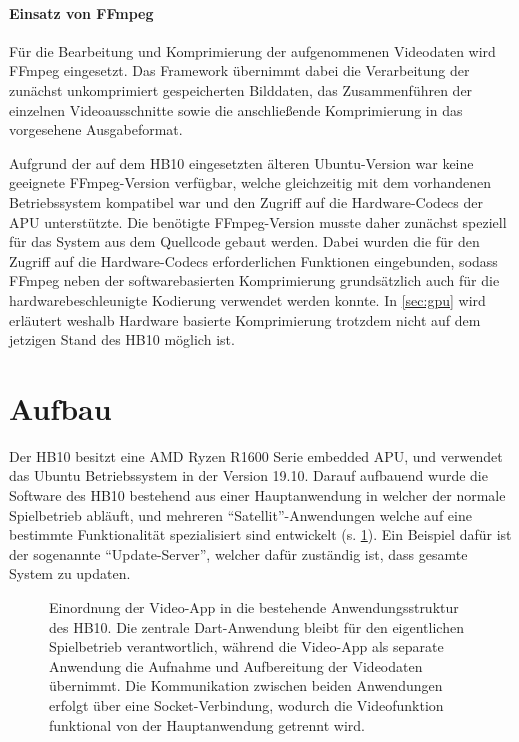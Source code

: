 \paragraph{Einsatz von FFmpeg} \label{sec:ffmpeg}

Für die Bearbeitung und Komprimierung der aufgenommenen Videodaten wird FFmpeg\cite{ffmpeg_doxygen} eingesetzt. Das Framework übernimmt dabei die Verarbeitung der zunächst unkomprimiert gespeicherten Bilddaten, das Zusammenführen der einzelnen Videoausschnitte sowie die anschließende Komprimierung in das vorgesehene Ausgabeformat. 

Aufgrund der auf dem HB10 eingesetzten älteren Ubuntu-Version war keine geeignete FFmpeg-Version verfügbar, welche gleichzeitig mit dem vorhandenen Betriebssystem kompatibel war und den Zugriff auf die Hardware-Codecs der APU unterstützte. 
Die benötigte FFmpeg-Version musste daher zunächst speziell für das System aus dem Quellcode gebaut werden. Dabei wurden die für den Zugriff auf die Hardware-Codecs erforderlichen Funktionen eingebunden, 
sodass FFmpeg neben der softwarebasierten Komprimierung grundsätzlich auch für die hardwarebeschleunigte Kodierung verwendet werden konnte. In \cref{sec:gpu} wird erläutert weshalb Hardware basierte Komprimierung trotzdem nicht auf dem jetzigen Stand des HB10 möglich ist.

\section{Aufbau}

Der HB10 besitzt eine AMD Ryzen R1600 Serie embedded APU, und verwendet das Ubuntu Betriebssystem in der Version 19.10. Darauf aufbauend wurde die Software des HB10 bestehend aus einer Hauptanwendung in welcher der normale Spielbetrieb abläuft, 
und mehreren \enquote{Satellit}-Anwendungen welche auf eine bestimmte Funktionalität spezialisiert sind entwickelt (s. \cref{fig:dartaufbau}). Ein Beispiel dafür ist der sogenannte \enquote{Update-Server}, welcher dafür zuständig ist, dass gesamte System zu updaten.
\begin{figure}[h]
    \centering
    
    \caption[Einordnung der Video-App in die HB10-Anwendungsstruktur]{Einordnung der Video-App in die bestehende Anwendungsstruktur des HB10. Die zentrale Dart-Anwendung bleibt für den eigentlichen Spielbetrieb verantwortlich, während die Video-App als separate Anwendung die Aufnahme und Aufbereitung der Videodaten übernimmt. 
    Die Kommunikation zwischen beiden Anwendungen erfolgt über eine Socket-Verbindung, wodurch die Videofunktion funktional von der Hauptanwendung getrennt wird.}
    \label{fig:dartaufbau}
\end{figure}

